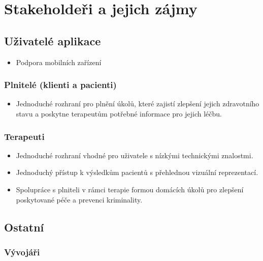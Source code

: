 \section{Stakeholdeři a jejich zájmy}\label{sec:stakeholderi}

\subsection*{Uživatelé aplikace}\label{subsec:uzivatele-aplikace}

\begin{itemize}
  \item
  Podpora mobilních zařízení
\end{itemize}

\subsubsection*{Plnitelé (klienti a pacienti)}\label{subsubsec:plnitele}

\begin{itemize}
  \item
  Jednoduché rozhraní pro plnění úkolů, které zajistí zlepšení jejich zdravotního stavu a poskytne terapeutům potřebné informace pro jejich léčbu.
\end{itemize}

\subsubsection*{Terapeuti}\label{subsubsec:terapeuti}

\begin{itemize}
  \item
  Jednoduché rozhraní vhodné pro uživatele s nízkými technickými znalostmi.
  \item
  Jednoduchý přístup k výsledkům pacientů s přehlednou vizuální reprezentací.
  \item
  Spolupráce s plniteli v rámci terapie formou domácích úkolů pro zlepšení poskytované péče a prevenci kriminality.
\end{itemize}

\subsection*{Ostatní}\label{subsec:ostatni}

\subsubsection*{Vývojáři}\label{subsubsec:vyvojari}

